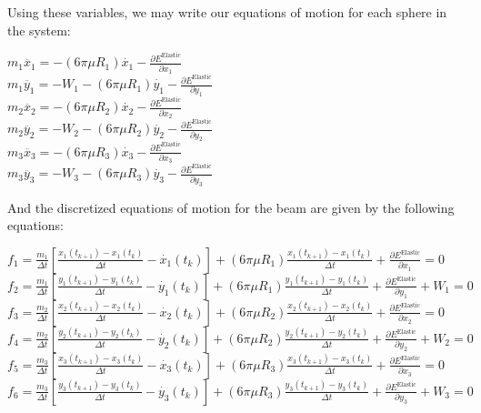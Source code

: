 \documentclass[letterpaper, 10 pt, conference]{ieeeconf}  %
\begin{document}
Using these variables, we may write our equations of motion for each sphere in the system:
\begin{center}
        $m_1\ddot{x_1} = -(6 \pi \mu R_1)\dot{x_1}-\frac{\partial E^{\text{Elastic}}}{\partial x_1}$ \\
        $m_1\ddot{y_1} = -W_1 -(6 \pi \mu R_1)\dot{y_1}-\frac{\partial E^{\text{Elastic}}}{\partial y_1}$ \\
        
        $m_2\ddot{x_2} = -(6 \pi \mu R_2)\dot{x_2}-\frac{\partial E^{\text{Elastic}}}{\partial x_2}$ \\
        $m_2\ddot{y_2} = -W_2 -(6 \pi \mu R_2)\dot{y_2}-\frac{\partial E^{\text{Elastic}}}{\partial y_2}$ \\
        
        $m_3\ddot{x_3} = -(6 \pi \mu R_3)\dot{x_3}-\frac{\partial E^{\text{Elastic}}}{\partial x_3}$ \\
        $m_3\ddot{y_3} = -W_3 -(6 \pi \mu R_3)\dot{y_3}-\frac{\partial E^{\text{Elastic}}}{\partial y_3}$ \\
\end{center}
        


And the discretized equations of motion for the beam are given by the following equations:
\begin{center}
$f_1 = \frac{m_1}{\Delta t} \left[\frac{x_1(t_{k+1}) - x_1(t_k)}{\Delta t} - \dot{x_1}(t_k)\right] + (6 \pi \mu R_1)\frac{x_1(t_{k+1}) - x_1(t_k)}{\Delta t} + \frac{\partial E^{\text{Elastic}}}{\partial x_1} = 0$ \\
$f_2 = \frac{m_1}{\Delta t} \left[\frac{y_1(t_{k+1}) - y_1(t_k)}{\Delta t} - \dot{y_1}(t_k)\right] + (6 \pi \mu R_1)\frac{y_1(t_{k+1}) - y_1(t_k)}{\Delta t} + \frac{\partial E^{\text{Elastic}}}{\partial y_1} + W_1 = 0$ \\

$f_3 = \frac{m_2}{\Delta t} \left[\frac{x_2(t_{k+1}) - x_2(t_k)}{\Delta t} - \dot{x_2}(t_k)\right] + (6 \pi \mu R_2)\frac{x_2(t_{k+1}) - x_2(t_k)}{\Delta t} + \frac{\partial E^{\text{Elastic}}}{\partial x_2} = 0$ \\
$f_4 = \frac{m_2}{\Delta t} \left[\frac{y_2(t_{k+1}) - y_2(t_k)}{\Delta t} - \dot{y_2}(t_k)\right] + (6 \pi \mu R_2)\frac{y_2(t_{k+1}) - y_2(t_k)}{\Delta t} + \frac{\partial E^{\text{Elastic}}}{\partial y_2} + W_2 = 0$ \\

$f_5 = \frac{m_3}{\Delta t} \left[\frac{x_3(t_{k+1}) - x_3(t_k)}{\Delta t} - \dot{x_3}(t_k)\right] + (6 \pi \mu R_3)\frac{x_3(t_{k+1}) - x_3(t_k)}{\Delta t} + \frac{\partial E^{\text{Elastic}}}{\partial x_3} = 0$ \\
$f_6 = \frac{m_3}{\Delta t} \left[\frac{y_3(t_{k+1}) - y_3(t_k)}{\Delta t} - \dot{y_3}(t_k)\right] + (6 \pi \mu R_3)\frac{y_3(t_{k+1}) - y_3(t_k)}{\Delta t} + \frac{\partial E^{\text{Elastic}}}{\partial y_3} + W_3  = 0$
\end{center}
\end{document}

